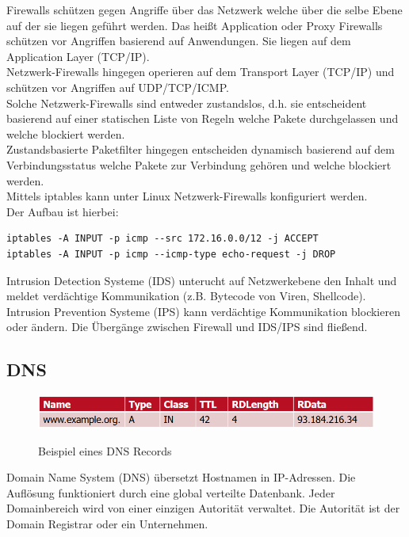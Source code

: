 \documentclass[a4paper,12pt,leqno]{article}
\begin{document}
Firewalls schützen gegen Angriffe über das Netzwerk welche über die selbe Ebene auf der sie liegen geführt werden. Das heißt Application oder Proxy Firewalls schützen vor Angriffen basierend auf Anwendungen. Sie liegen auf dem Application Layer (TCP/IP).\\
Netzwerk-Firewalls hingegen operieren auf dem Transport Layer (TCP/IP) und schützen vor Angriffen auf UDP/TCP/ICMP.\\
Solche Netzwerk-Firewalls sind entweder zustandslos, d.h. sie entscheident basierend auf einer statischen Liste von Regeln welche Pakete durchgelassen und welche blockiert werden.\\
Zustandsbasierte Paketfilter hingegen entscheiden dynamisch basierend auf dem Verbindungsstatus welche Pakete zur Verbindung gehören und welche blockiert werden.\\

Mittels iptables kann unter Linux Netzwerk-Firewalls konfiguriert werden.\\
Der Aufbau ist hierbei:
\begin{lstlisting}
iptables -A INPUT -p icmp --src 172.16.0.0/12 -j ACCEPT
iptables -A INPUT -p icmp --icmp-type echo-request -j DROP
\end{lstlisting}
Intrusion Detection Systeme (IDS) unterucht auf Netzwerkebene den Inhalt und meldet verdächtige Kommunikation (z.B. Bytecode von Viren, Shellcode). Intrusion Prevention Systeme (IPS) kann verdächtige Kommunikation blockieren oder ändern. Die Übergänge zwischen Firewall und IDS/IPS sind fließend.

\subsection{DNS}

\begin{figure}[h!]
\centering
\includegraphics[scale=0.5]{Grafiken/DNS-Record.png}
\label{pic:DNS-Record}
\caption{Beispiel eines DNS Records}
\end{figure}

Domain Name System (DNS) übersetzt Hostnamen in IP-Adressen. Die Auflösung funktioniert durch eine global verteilte Datenbank. Jeder Domainbereich wird von einer einzigen Autorität verwaltet. Die Autorität ist der Domain Registrar oder ein Unternehmen.\\
\end{document}
